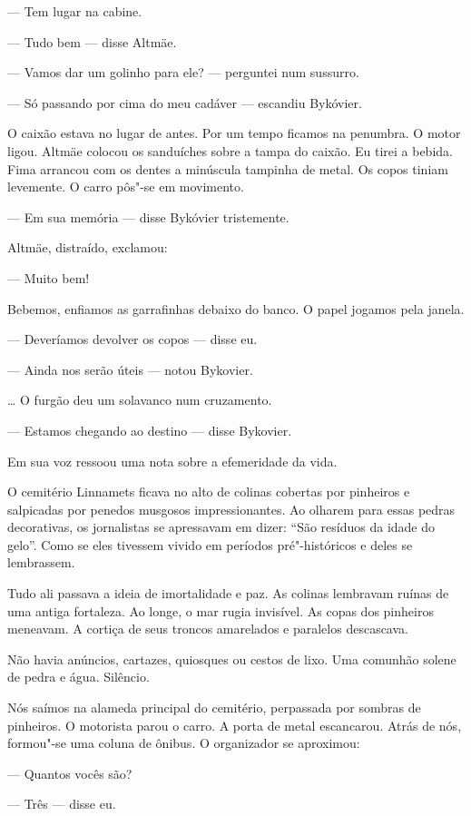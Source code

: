 --- Tem lugar na cabine.

--- Tudo bem --- disse Altmäe.

--- Vamos dar um golinho para ele? --- perguntei num sussurro.

--- Só passando por cima do meu cadáver --- escandiu Bykóvier.

O caixão estava no lugar de antes. Por um tempo ficamos na penumbra. O
motor ligou. Altmäe colocou os sanduíches sobre a tampa do caixão. Eu
tirei a bebida. Fima arrancou com os dentes a minúscula tampinha de
metal. Os copos tiniam levemente. O carro pôs"-se em movimento.

--- Em sua memória --- disse Bykóvier tristemente.

Altmäe, distraído, exclamou:

--- Muito bem!

Bebemos, enfiamos as garrafinhas debaixo do banco. O papel jogamos pela
janela.

--- Deveríamos devolver os copos --- disse eu.

--- Ainda nos serão úteis --- notou Bykovier.

\ldots{} O furgão deu um solavanco num cruzamento.

--- Estamos chegando ao destino --- disse Bykovier.

Em sua voz ressoou uma nota sobre a efemeridade da vida.

O cemitério Linnamets ficava no alto de colinas cobertas por pinheiros e
salpicadas por penedos musgosos impressionantes. Ao olharem para essas
pedras decorativas, os jornalistas se apressavam em dizer: ``São
resíduos da idade do gelo''. Como se eles tivessem vivido em períodos
pré"-históricos e deles se lembrassem.

Tudo ali passava a ideia de imortalidade e paz. As colinas lembravam
ruínas de uma antiga fortaleza. Ao longe, o mar rugia invisível. As
copas dos pinheiros meneavam. A cortiça de seus troncos amarelados e
paralelos descascava.

Não havia anúncios, cartazes, quiosques ou cestos de lixo. Uma comunhão
solene de pedra e água. Silêncio.

Nós saímos na alameda principal do cemitério, perpassada por sombras de
pinheiros. O motorista parou o carro. A porta de metal escancarou. Atrás
de nós, formou"-se uma coluna de ônibus. O organizador se aproximou:

--- Quantos vocês são?

--- Três --- disse eu.

